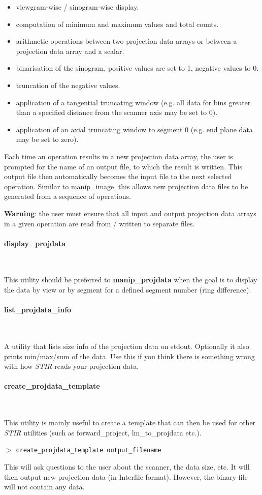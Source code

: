 \documentclass{article}
\newcommand{\subsubsubsection}[1]{\paragraph{#1}\mbox{} \\}
\newcommand{\cmdline}[1]{\par \noindent $>$ \texttt{#1}\par}
\begin{document}
{\begin{itemize}
\item viewgram-wise / sinogram-wise display.
\item computation of minimum and maximum values and total counts.
\item arithmetic operations between two projection data arrays or 
between a projection data array and a scalar.
\item binarisation of the sinogram, positive values are set to 1, 
negative values to 0.
\item truncation of the negative values.
\item application of a tangential truncating window (e.g. all data 
for bins greater than a specified distance from the scanner axis 
may be set to 0).
\item application of an axial truncating window to segment 0 (e.g. 
end plane data may be set to zero).
\end{itemize}
Each time an operation results in a new projection data array, 
the user is prompted for the name of an output file, to which 
the result is written. This output file then automatically becomes 
the input file to the next selected operation. Similar to manip\_image, 
this allows new projection data files to be generated from a 
sequence of operations.


\textbf{Warning}: the user must ensure that all input and output projection 
data arrays in a given operation are read from / written to separate 
files.

{ \subsubsubsection{display\_projdata}
}

This utility should be preferred to \textbf{manip\_projdata} when the 
goal is to display the data by view or by segment for a defined 
segment number (ring difference).

{ \subsubsubsection{list\_projdata\_info}
}

A utility that lists size info of the projection data on stdout. Optionally
it also prints min/max/sum of the data. 
Use this if you think there is something wrong with how \textit{STIR} 
reads your projection data.

{ \subsubsubsection{create\_projdata\_template}
}

This utility is mainly useful to create a template that can then 
be used for other \textit{STIR} utilities (such as forward\_project, lm\_to\_projdata 
etc.).
\cmdline{create\_projdata\_template output\_filename}

This will ask questions to the user about the scanner, the data 
size, etc. It will then output new projection data (in Interfile 
format). However, the binary file will not contain any data.

}
\end{document}
